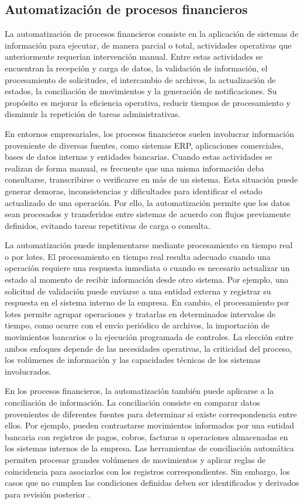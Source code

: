 \subsection{Automatización de procesos financieros}

La automatización de procesos financieros consiste en la aplicación de sistemas de información para ejecutar, de manera parcial o total, actividades operativas que anteriormente requerían intervención manual. Entre estas actividades se encuentran la recepción y carga de datos, la validación de información, el procesamiento de solicitudes, el intercambio de archivos, la actualización de estados, la conciliación de movimientos y la generación de notificaciones. Su propósito es mejorar la eficiencia operativa, reducir tiempos de procesamiento y disminuir la repetición de tareas administrativas.

En entornos empresariales, los procesos financieros suelen involucrar información proveniente de diversas fuentes, como sistemas ERP, aplicaciones comerciales, bases de datos internas y entidades bancarias. Cuando estas actividades se realizan de forma manual, es frecuente que una misma información deba consultarse, transcribirse o verificarse en más de un sistema. Esta situación puede generar demoras, inconsistencias y dificultades para identificar el estado actualizado de una operación. Por ello, la automatización permite que los datos sean procesados y transferidos entre sistemas de acuerdo con flujos previamente definidos, evitando tareas repetitivas de carga o consulta.

La automatización puede implementarse mediante procesamiento en tiempo real o por lotes. El procesamiento en tiempo real resulta adecuado cuando una operación requiere una respuesta inmediata o cuando es necesario actualizar un estado al momento de recibir información desde otro sistema. Por ejemplo, una solicitud de validación puede enviarse a una entidad externa y registrar su respuesta en el sistema interno de la empresa. En cambio, el procesamiento por lotes permite agrupar operaciones y tratarlas en determinados intervalos de tiempo, como ocurre con el envío periódico de archivos, la importación de movimientos bancarios o la ejecución programada de controles. La elección entre ambos enfoques depende de las necesidades operativas, la criticidad del proceso, los volúmenes de información y las capacidades técnicas de los sistemas involucrados.

En los procesos financieros, la automatización también puede aplicarse a la conciliación de información. La conciliación consiste en comparar datos provenientes de diferentes fuentes para determinar si existe correspondencia entre ellos. Por ejemplo, pueden contrastarse movimientos informados por una entidad bancaria con registros de pagos, cobros, facturas u operaciones almacenadas en los sistemas internos de la empresa. Las herramientas de conciliación automática permiten procesar grandes volúmenes de movimientos y aplicar reglas de coincidencia para asociarlos con los registros correspondientes. Sin embargo, los casos que no cumplen las condiciones definidas deben ser identificados y derivados para revisión posterior \citep{oracle_recon}.

